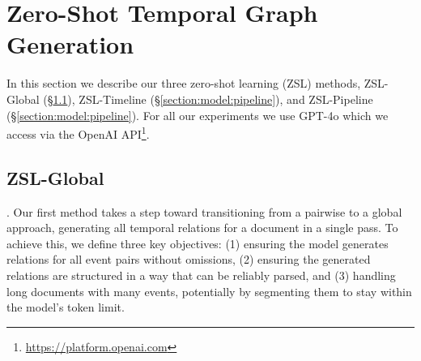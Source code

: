 \section{Zero-Shot Temporal Graph Generation}
\label{section:model}



% 

In this section we describe our three zero-shot learning (ZSL) methods, ZSL-Global (§\ref{section:model:global}), ZSL-Timeline (§\ref{section:model:pipeline}), and ZSL-Pipeline (§\ref{section:model:pipeline}). For all our experiments we use GPT-4o which we access via the OpenAI API\footnote{\url{https://platform.openai.com}}.


\subsection{ZSL-Global}
\label{section:model:global}
.
Our first method takes a step toward transitioning from a pairwise to a global approach, generating all temporal relations for a document in a single pass. 
To achieve this, we define three key objectives: (1) ensuring the model generates relations for all event pairs without omissions, (2) ensuring the generated relations are structured in a way that can be reliably parsed, and (3) handling long documents with many events, potentially by segmenting them to stay within the model’s token limit.


